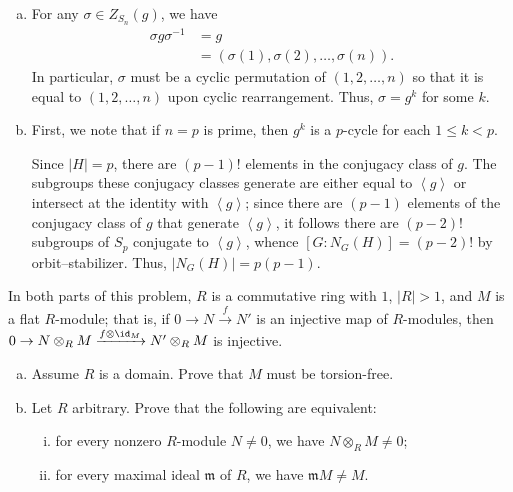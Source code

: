 \documentclass[10pt]{mypackage}
\begin{document}
\begin{solution}\hfill
  \begin{enumerate}[(a)]
    \item For any $\sigma\in Z_{S_n}(g)$, we have 
      \begin{align*}
        \sigma g \sigma^{-1} &= g\\
                             &= \left( \sigma(1),\sigma(2),\dots,\sigma(n) \right).
      \end{align*}
      In particular, $\sigma$ must be a cyclic permutation of $\left( 1,2,\dots,n \right)$ so that it is equal to $\left( 1,2,\dots,n \right)$ upon cyclic rearrangement. Thus, $\sigma = g^{k}$ for some $k$.
    \item First, we note that if $n = p$ is prime, then $g^{k}$ is a $p$-cycle for each $1\leq k < p$.

      Since $\left\vert H \right\vert = p$, there are $\left( p-1 \right)!$ elements in the conjugacy class of $g$. The subgroups these conjugacy classes generate are either equal to $ \left\langle g \right\rangle $ or intersect at the identity with $ \left\langle g \right\rangle $; since there are $\left( p-1 \right)$ elements of the conjugacy class of $g$ that generate $ \left\langle g \right\rangle $, it follows there are $\left( p-2 \right)!$ subgroups of $S_p$ conjugate to $ \left\langle g \right\rangle $, whence $\left[ G:N_G(H) \right] = \left( p-2 \right)!$ by orbit--stabilizer. Thus, $\left\vert N_G(H) \right\vert = p\left( p-1 \right)$.
  \end{enumerate}
\end{solution}
\begin{problem}[Problem 6]
  In both parts of this problem, $R$ is a commutative ring with $1$, $\left\vert R  \right\vert > 1$, and $M$ is a flat $R$-module; that is, if $0\rightarrow N\xrightarrow{f} N'$ is an injective map of $R$-modules, then $0\rightarrow N\otimes_{R}M\xrightarrow{f\otimes \id_M}N'\otimes_{R}M$ is injective.
  \begin{enumerate}[(a)]
    \item Assume $R$ is a domain. Prove that $M$ must be torsion-free.
    \item Let $R$ arbitrary. Prove that the following are equivalent:
      \begin{enumerate}[(i)]
        \item for every nonzero $R$-module $N\neq 0$, we have $N\otimes_{R}M\neq 0$;
        \item for every maximal ideal $ \mathfrak{m} $ of $R$, we have $ \mathfrak{m}M \neq M $.
      \end{enumerate}
  \end{enumerate}
\end{problem}
\end{document}
